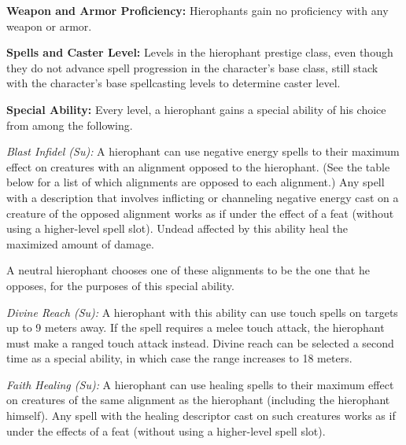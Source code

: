 {
\textbf{Weapon and Armor Proficiency:} Hierophants gain no proficiency with any weapon or armor.

\textbf{Spells and Caster Level:} Levels in the hierophant prestige class, even though they do not advance spell progression in the character's base class, still stack with the character's base spellcasting levels to determine caster level.

\textbf{Special Ability:} Every level, a hierophant gains a special ability of his choice from among the following.


\textit{Blast Infidel (Su):} A hierophant can use negative energy spells to their maximum effect on creatures with an alignment opposed to the hierophant. (See the table below for a list of which alignments are opposed to each alignment.) Any spell with a description that involves inflicting or channeling negative energy cast on a creature of the opposed alignment works as if under the effect of a  feat (without using a higher-level spell slot). Undead affected by this ability heal the maximized amount of damage.

A neutral hierophant chooses one of these alignments to be the one that he opposes, for the purposes of this special ability.

\textit{Divine Reach (Su):} A hierophant with this ability can use touch spells on targets up to 9 meters away. If the spell requires a melee touch attack, the hierophant must make a ranged touch attack instead. Divine reach can be selected a second time as a special ability, in which case the range increases to 18 meters.

\textit{Faith Healing (Su):} A hierophant can use healing spells to their maximum effect on creatures of the same alignment as the hierophant (including the hierophant himself). Any spell with the healing descriptor cast on such creatures works as if under the effects of a  feat (without using a higher-level spell slot).

}
